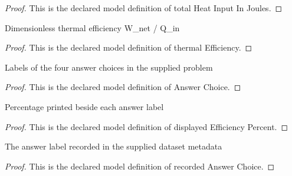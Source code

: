 \begin{proof}
  This is the declared model definition of total Heat Input In Joules.
\end{proof}
\begin{definition}
  \label{def:physics:phyx-mini-0350:phyxminiproblems-problemphyxmini0350-thermalefficiency}
  Dimensionless thermal efficiency W\_net / Q\_in
\end{definition}
\begin{proof}
  This is the declared model definition of thermal Efficiency.
\end{proof}
\begin{definition}
  \label{def:physics:phyx-mini-0350:phyxminiproblems-problemphyxmini0350-answerchoice}
  Labels of the four answer choices in the supplied problem
\end{definition}
\begin{proof}
  This is the declared model definition of Answer Choice.
\end{proof}
\begin{definition}
  \label{def:physics:phyx-mini-0350:phyxminiproblems-problemphyxmini0350-displayedefficiencypercent}
  Percentage printed beside each answer label
\end{definition}
\begin{proof}
  This is the declared model definition of displayed Efficiency Percent.
\end{proof}
\begin{definition}
  \label{def:physics:phyx-mini-0350:phyxminiproblems-problemphyxmini0350-recordedanswerchoice}
  The answer label recorded in the supplied dataset metadata
\end{definition}
\begin{proof}
  This is the declared model definition of recorded Answer Choice.
\end{proof}
